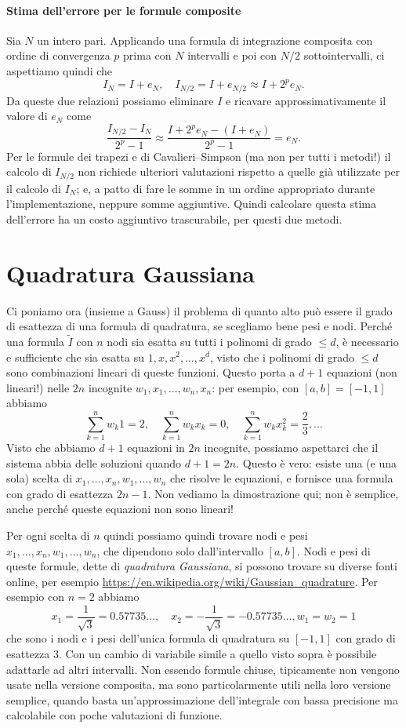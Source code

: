 \documentclass[a4paper]{report}
\theoremstyle{definiton}
\theoremstyle{remark}
\begin{document}
\paragraph{Stima dell'errore per le formule composite} Sia $N$ un intero pari. Applicando una formula di integrazione composita con ordine di convergenza $p$ prima con $N$ intervalli e poi con $N/2$ sottointervalli, ci aspettiamo quindi che
\[
I_N = I + e_N, \quad I_{N/2} = I + e_{N/2} \approx I + 2^{p}e_N.
\]
Da queste due relazioni possiamo eliminare $I$ e ricavare approssimativamente il valore di $e_N$ come
\[
\frac{I_{N/2} - I_{N}}{2^p -1} \approx \frac{I + 2^p e_N -(I+e_N)}{2^p-1} = e_N.
\]
Per le formule dei trapezi e di Cavalieri--Simpson (ma non per tutti i metodi!) il calcolo di $I_{N/2}$ non richiede ulteriori valutazioni rispetto a quelle già utilizzate per il calcolo di $I_N$; e, a patto di fare le somme in un ordine appropriato durante l'implementazione, neppure somme aggiuntive. Quindi calcolare questa stima dell'errore ha un costo aggiuntivo trascurabile, per questi due metodi.


\section{Quadratura Gaussiana}
Ci poniamo ora (insieme a Gauss) il problema di quanto alto può essere il grado di esattezza di una formula di quadratura, se scegliamo bene pesi e nodi. Perché una formula $\tilde{I}$ con $n$ nodi sia esatta su tutti i polinomi di grado $ \leq d$, è necessario e sufficiente che sia esatta su $1, x, x^2, \dots, x^{d}$, visto che i polinomi di grado $\leq d$ sono combinazioni lineari di queste funzioni. Questo porta a $d+1$ equazioni (non lineari!) nelle $2n$ incognite $w_1,x_1,\dots, w_n,x_n$: per esempio, con $[a,b]=[-1,1]$ abbiamo
\[
\sum_{k=1}^n w_k 1 = 2, \quad \sum_{k=1}^n w_k x_k = 0, \quad \sum_{k=1}^n w_k x_k^2 = \frac23, \dots
\]
Visto che abbiamo $d+1$ equazioni in $2n$ incognite, possiamo aspettarci che il sistema abbia delle soluzioni quando $d+1=2n$.  Questo è vero: esiste una (e una sola) scelta di $x_1,\dots,x_n,w_1,\dots,w_n$ che risolve le equazioni, e fornisce una formula con grado di esattezza $2n-1$. Non vediamo la dimostrazione qui; non è semplice, anche perché queste equazioni non sono lineari!

Per ogni scelta di $n$ quindi possiamo quindi trovare nodi e pesi $x_1,\dots,x_n,w_1,\dots,w_n$, che dipendono solo dall'intervallo $[a,b]$. Nodi e pesi di queste formule, dette di \emph{quadratura Gaussiana}, si possono trovare su diverse fonti online, per esempio \url{https://en.wikipedia.org/wiki/Gaussian_quadrature}. Per esempio con $n=2$ abbiamo
\[
x_1 = \frac{1}{\sqrt{3}} = 0.57735\dots, \quad x_2 = -\frac{1}{\sqrt{3}} = -0.57735\dots, w_1=w_2=1
\]
che sono i nodi e i pesi dell'unica formula di quadratura su $[-1,1]$ con grado di esattezza $3$. Con un cambio di variabile simile a quello visto sopra è possibile adattarle ad altri intervalli. Non essendo formule chiuse, tipicamente non vengono usate nella versione composita, ma sono particolarmente utili nella loro versione semplice, quando basta un'approssimazione dell'integrale con bassa precisione ma calcolabile con poche valutazioni di funzione.
\end{document}
